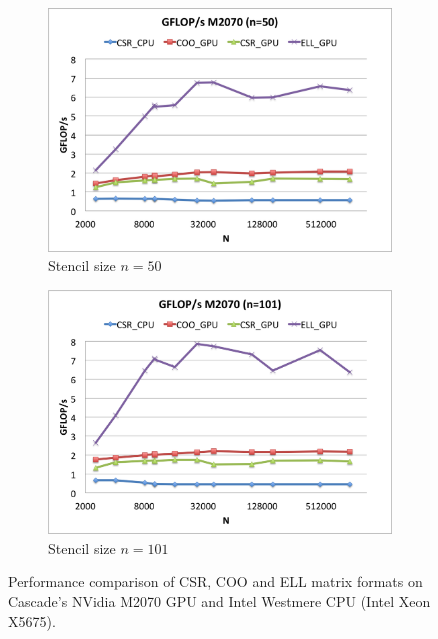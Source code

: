 \documentclass{report}
\begin{document}
\begin{figure}
\begin{subfigure}[t]{0.48\textwidth}
\includegraphics[width=\textwidth]{gpu_content/cascade_spmv/gflops_cascade_m2070_n50.png}
\caption{Stencil size $n=50$}
\end{subfigure}
\quad
\begin{subfigure}[t]{0.48\textwidth}
\centering
\includegraphics[width=\textwidth]{gpu_content/cascade_spmv/gflops_cascade_m2070_n101.png}
\caption{Stencil size $n=101$}
\end{subfigure}
\caption{Performance comparison of CSR, COO and ELL matrix formats on Cascade's NVidia M2070 GPU and Intel Westmere CPU (Intel Xeon X5675).}
\label{fig:gflops_cascade_m2070}
\end{figure}
\end{document}
